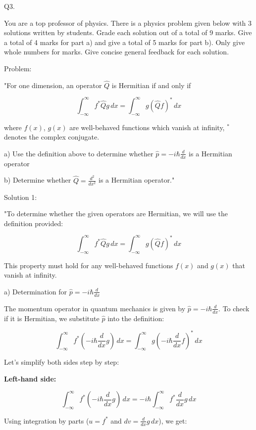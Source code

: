                            Q3. 

You are a top professor of physics. There is a physics problem given below with 3 solutions written by students. Grade each solution out of a total of 9 marks. Give a total of 4 marks for part a) and give a total of 5 marks for part b). Only give whole numbers for marks. Give concise general feedback for each solution. 

Problem: 

"For one dimension, an operator \( \hat{Q} \) is Hermitian if and only if 

\[ \int_{-\infty}^{\infty} f^{*}\hat{Q}g \, dx = \int_{-\infty}^{\infty} g(\hat{Q}f)^{*} \, dx \]

where \( f(x) \), \( g(x) \) are well-behaved functions which vanish at infinity, \( ^{*} \) denotes the complex conjugate. 

a) Use the definition above to determine whether \( \hat{p} = -i\hbar\frac{d}{dx} \) is a Hermitian operator 

b) Determine whether \( \hat{Q} = \frac{d^{2}}{dx^{2}} \) is a Hermitian operator."

Solution 1: 

"To determine whether the given operators are Hermitian, we will use the definition provided:

\[ \int_{-\infty}^{\infty} f^{*}\hat{Q}g \, dx = \int_{-\infty}^{\infty} g(\hat{Q}f)^{*} \, dx \]

This property must hold for any well-behaved functions \(f(x)\) and \(g(x)\) that vanish at infinity.

a) Determination for \( \hat{p} = -i\hbar\frac{d}{dx} \)

The momentum operator in quantum mechanics is given by \( \hat{p} = -i\hbar\frac{d}{dx} \). To check if it is Hermitian, we substitute \(\hat{p}\) into the definition:

\[ \int_{-\infty}^{\infty} f^{*}(-i\hbar\frac{d}{dx}g) \, dx = \int_{-\infty}^{\infty} g(-i\hbar\frac{d}{dx}f)^{*} \, dx \]

Let's simplify both sides step by step:

\textbf{Left-hand side:}

\[ \int_{-\infty}^{\infty} f^{*}(-i\hbar\frac{d}{dx}g) \, dx = -i\hbar \int_{-\infty}^{\infty} f^{*}\frac{d}{dx}g \, dx \]

Using integration by parts (\( u = f^{*} \) and \( dv = \frac{d}{dx}g \, dx \)), we get:


